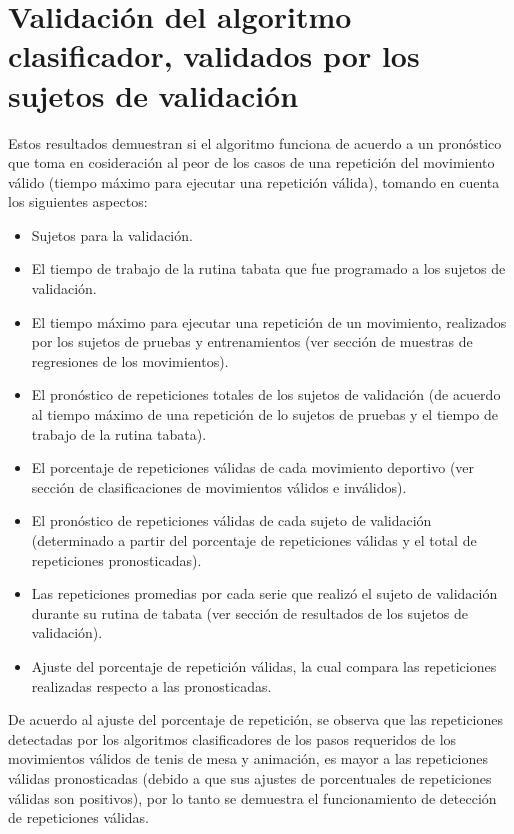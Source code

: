 \section{Validaci\'on del algoritmo clasificador,   validados por los sujetos de validaci\'on} \label{res:valResults}
Estos resultados demuestran si el algoritmo funciona de acuerdo a un pron\'ostico que toma en cosideraci\'on al peor de los casos de una repetici\'on del movimiento v\'alido (tiempo m\'aximo para ejecutar una repetici\'on v\'alida), tomando en cuenta los siguientes aspectos:
\begin{itemize}
\item Sujetos para la validaci\'on.
\item El tiempo de trabajo de la rutina tabata que fue programado a los sujetos de validaci\'on.
\item El tiempo m\'aximo para ejecutar una repetici\'on de un movimiento, realizados por los sujetos de pruebas y entrenamientos (ver secci\'on de muestras de regresiones de los movimientos).
\item El pron\'ostico de repeticiones totales de los sujetos de validaci\'on (de acuerdo al tiempo m\'aximo de una repetici\'on de lo sujetos de pruebas y el tiempo de trabajo de la rutina tabata).
\item El porcentaje de repeticiones v\'alidas de cada movimiento deportivo (ver secci\'on de clasificaciones de movimientos v\'alidos e inv\'alidos).
\item El pron\'ostico de repeticiones v\'alidas de cada sujeto de validaci\'on (determinado a partir del porcentaje de repeticiones v\'alidas y el total de repeticiones pronosticadas).
\item Las repeticiones promedias por cada serie que realiz\'o el sujeto de validaci\'on durante su rutina de tabata (ver secci\'on de resultados de los sujetos de validaci\'on).
\item  Ajuste del porcentaje de repetici\'on v\'alidas, la cual compara las repeticiones realizadas respecto a las pronosticadas.
\end{itemize}
\medbreak
De acuerdo al ajuste del porcentaje de repetici\'on, se observa que las repeticiones detectadas por los algoritmos clasificadores de los pasos requeridos de los movimientos v\'alidos de tenis de mesa y animaci\'on, es mayor a las repeticiones v\'alidas pronosticadas (debido a que sus ajustes de porcentuales de repeticiones v\'alidas son positivos), por lo tanto se demuestra el funcionamiento de detecci\'on de repeticiones v\'alidas.
\medbreak
